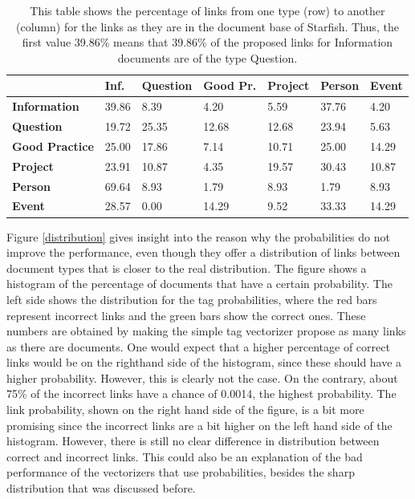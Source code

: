 \begin{table}
\begin{tabular}{| l | l | l | l | l | l | l | }
\hline
 & {\bf Inf. }& {\bf Question }& {\bf Good Pr.} & {\bf Project }&{\bf Person }& {\bf Event} \\
\hline
{\bf Information} &  39.86 & 8.39 &4.20 &5.59 &37.76 &4.20\\
{\bf Question} & 19.72 &25.35 &12.68 &12.68 &23.94 &5.63\\
{\bf Good Practice} & 25.00 & 17.86 & 7.14 & 10.71 & 25.00 & 14.29 \\
{\bf Project } & 23.91 & 10.87 & 4.35 & 19.57 & 30.43 & 10.87 \\
{\bf Person} & 69.64 & 8.93 & 1.79 & 8.93 & 1.79 & 8.93 \\
{\bf Event }& 28.57 & 0.00 & 14.29 & 9.52 & 33.33 & 14.29\\
\hline
\end{tabular}
\caption{This table shows the percentage of links from one type (row) to another (column) for the links as they are in the document base of Starfish. Thus, the first value 39.86\% means that 39.86\% of the proposed links for Information documents are of the type Question.}
\label{bayes_table3}
\end{table}

Figure \ref{distribution} gives insight into the reason why the probabilities
do not improve the performance, even though they offer a distribution of links between document types that is closer to the real distribution. The figure shows a histogram of the percentage
of documents that have a certain probability. The left side shows the
distribution for the tag probabilities, where the red bars represent incorrect
links and the green bars show the correct ones. These numbers are obtained by
making the simple tag vectorizer propose as many links as there are documents.
One would expect that a higher percentage of correct links would be on the righthand side of the histogram,
since these should have a higher probability. However, this is clearly not the
case. On the contrary, about 75\% of the incorrect links have a chance of
0.0014, the highest probability. The link probability, shown on the right hand
side of the figure, is a bit more promising since the incorrect links are a bit
higher on the left hand side of the histogram. However, there is still no clear
difference in distribution between correct and incorrect links. This could also be
an explanation of the bad performance of the vectorizers that use probabilities, besides
the sharp distribution that was discussed before. 

